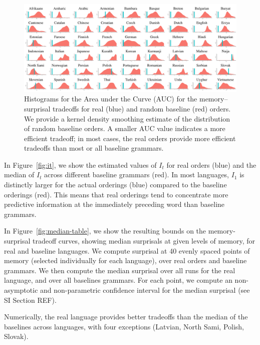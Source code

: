 \begin{figure}
	\begin{center}
\includegraphics[width=\textwidth]{auc-table.pdf}
\end{center}
\caption{Histograms for the Area under the Curve (AUC) for the memory--surprisal tradeoffs for real (blue) and random baseline (red) orders.
We provide a kernel density smoothing estimate of the distribution of random baseline orders.
A smaller AUC value indicates a more efficient tradeoff; in most cases, the real orders provide more efficient tradeoffs than most or all baseline grammars.
}\label{fig:auc}
\end{figure}






In Figure~\ref{fig:it}, we show the estimated values of $I_t$ for real orders (blue) and the median of $I_t$ across different baseline grammars (red).
In most languages, $I_1$ is distinctly larger for the actual orderings (blue) compared to the baseline orderings (red). This means that real orderings tend to concentrate more predictive information at the immediately preceding word than baseline grammars.

In Figure~\ref{fig:median-table}, we show the resulting bounds on the memory-surprisal tradeoff curves, showing median surprisals at given levels of memory, for real and baseline languages.
We compute surprisal at 40 evenly spaced points of memory (selected individually for each language), over real orders and baseline grammars.
We then compute the median surprisal over all runs for the real language, and over all baselines grammars.
For each point, we compute an non-asymptotic and non-parametric confidence interval for the median surprisal (see SI Section REF).

Numerically, the real language provides better tradeoffs than the median of the baselines across languages, with four exceptions (Latvian, North Sami, Polish, Slovak).


